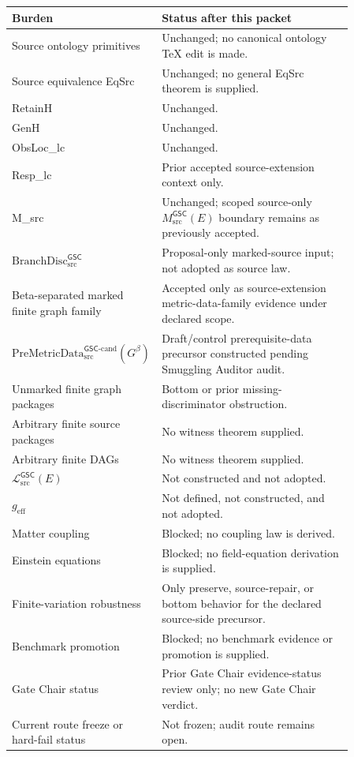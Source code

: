 \documentclass[11pt]{article}
\newcommand{\PreMetricData}{\mathrm{PreMetricData}_{\mathrm{src}}^{\mathsf{GSC}\mbox{-}\mathrm{cand}}}
\newcommand{\MetricData}{\mathcal{L}_{\mathrm{src}}^{\mathsf{GSC}}}
\newcommand{\BranchDisc}{\mathrm{BranchDisc}_{\mathrm{src}}^{\mathsf{GSC}}}
\newcommand{\Gbeta}{G^\beta}
\newcommand{\geff}{g_{\mathrm{eff}}}
\begin{document}
\begin{longtable}{p{0.30\linewidth}p{0.56\linewidth}}
\toprule
Burden & Status after this packet \\
\midrule
Source ontology primitives & Unchanged; no canonical ontology TeX edit is made. \\
Source equivalence EqSrc & Unchanged; no general EqSrc theorem is supplied. \\
RetainH & Unchanged. \\
GenH & Unchanged. \\
ObsLoc\_lc & Unchanged. \\
Resp\_lc & Prior accepted source-extension context only. \\
M\_src & Unchanged; scoped source-only \(M_{\mathrm{src}}^{\mathsf{GSC}}(E)\) boundary remains as previously accepted. \\
\(\BranchDisc\) & Proposal-only marked-source input; not adopted as source law. \\
Beta-separated marked finite graph family & Accepted only as source-extension metric-data-family evidence under declared scope. \\
\(\PreMetricData(\Gbeta)\) & Draft/control prerequisite-data precursor constructed pending Smuggling Auditor audit. \\
Unmarked finite graph packages & Bottom or prior missing-discriminator obstruction. \\
Arbitrary finite source packages & No witness theorem supplied. \\
Arbitrary finite DAGs & No witness theorem supplied. \\
\(\MetricData(E)\) & Not constructed and not adopted. \\
\(\geff\) & Not defined, not constructed, and not adopted. \\
Matter coupling & Blocked; no coupling law is derived. \\
Einstein equations & Blocked; no field-equation derivation is supplied. \\
Finite-variation robustness & Only preserve, source-repair, or bottom behavior for the declared source-side precursor. \\
Benchmark promotion & Blocked; no benchmark evidence or promotion is supplied. \\
Gate Chair status & Prior Gate Chair evidence-status review only; no new Gate Chair verdict. \\
Current route freeze or hard-fail status & Not frozen; audit route remains open. \\
\bottomrule
\end{longtable}
\end{document}
